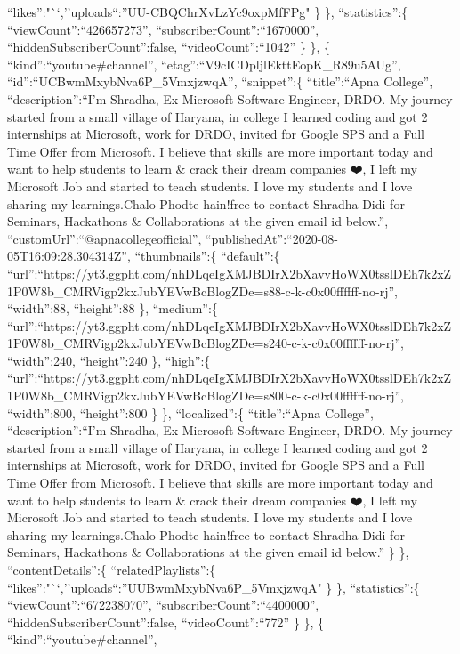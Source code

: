 \documentclass[11pt]{article}
\begin{document}
``likes'':"``,''uploads``:''UU-CBQChrXvLzYc9oxpMfFPg" \} \},
``statistics'':\{ ``viewCount'':``426657273'',
``subscriberCount'':``1670000'', ``hiddenSubscriberCount'':false,
``videoCount'':``1042'' \} \}, \{ ``kind'':``youtube\#channel'',
``etag'':``V9cICDpljlEkttEopK\_R89u5AUg'',
``id'':``UCBwmMxybNva6P\_5VmxjzwqA'', ``snippet'':\{ ``title'':``Apna
College'', ``description'':``I'm Shradha, Ex-Microsoft Software
Engineer, DRDO. My journey started from a small village of Haryana, in
college I learned coding and got 2 internships at Microsoft, work for
DRDO, invited for Google SPS and a Full Time Offer from Microsoft. I
believe that skills are more important today and want to help students
to learn \& crack their dream companies ❤️\nSo, I left my Microsoft Job
and started to teach students. I love my students and I love sharing my
learnings.\nTo Chalo Phodte hain!\n\n\nFeel free to contact Shradha Didi
for Seminars, Hackathons \& Collaborations at the given email id
below.\n\n\n'', ``customUrl'':``@apnacollegeofficial'',
``publishedAt'':``2020-08-05T16:09:28.304314Z'', ``thumbnails'':\{
``default'':\{
``url'':``https://yt3.ggpht.com/nhDLqeIgXMJBDIrX2bXavvHoWX0tsslDEh7k2xZ1P0W8b\_CMRVigp2kxJubYEVwBcBlogZDe=s88-c-k-c0x00ffffff-no-rj'',
``width'':88, ``height'':88 \}, ``medium'':\{
``url'':``https://yt3.ggpht.com/nhDLqeIgXMJBDIrX2bXavvHoWX0tsslDEh7k2xZ1P0W8b\_CMRVigp2kxJubYEVwBcBlogZDe=s240-c-k-c0x00ffffff-no-rj'',
``width'':240, ``height'':240 \}, ``high'':\{
``url'':``https://yt3.ggpht.com/nhDLqeIgXMJBDIrX2bXavvHoWX0tsslDEh7k2xZ1P0W8b\_CMRVigp2kxJubYEVwBcBlogZDe=s800-c-k-c0x00ffffff-no-rj'',
``width'':800, ``height'':800 \} \}, ``localized'':\{ ``title'':``Apna
College'', ``description'':``I'm Shradha, Ex-Microsoft Software
Engineer, DRDO. My journey started from a small village of Haryana, in
college I learned coding and got 2 internships at Microsoft, work for
DRDO, invited for Google SPS and a Full Time Offer from Microsoft. I
believe that skills are more important today and want to help students
to learn \& crack their dream companies ❤️\nSo, I left my Microsoft Job
and started to teach students. I love my students and I love sharing my
learnings.\nTo Chalo Phodte hain!\n\n\nFeel free to contact Shradha Didi
for Seminars, Hackathons \& Collaborations at the given email id
below.\n\n\n'' \} \}, ``contentDetails'':\{ ``relatedPlaylists'':\{
``likes'':"``,''uploads``:''UUBwmMxybNva6P\_5VmxjzwqA" \} \},
``statistics'':\{ ``viewCount'':``672238070'',
``subscriberCount'':``4400000'', ``hiddenSubscriberCount'':false,
``videoCount'':``772'' \} \}, \{ ``kind'':``youtube\#channel'',
\end{document}
